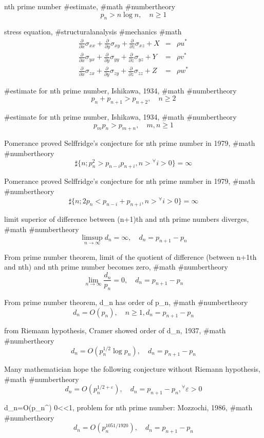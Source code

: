 nth prime number #estimate, #math #numbertheory
$$
p_n>n\log n, \quad n \ge 1
$$

stress equation, #structuralanalysis #mechanics #math
$$
\begin{array}{lll}
\frac{\partial}{\partial x}\sigma_{xx}+\frac{\partial}{\partial y}\sigma_{xy}+\frac{\partial}{\partial z}\sigma_{xz}+X &=& \rho u^* \\
\frac{\partial}{\partial x}\sigma_{yx}+\frac{\partial}{\partial y}\sigma_{yy}+\frac{\partial}{\partial z}\sigma_{yz}+Y &=& \rho v^* \\
\frac{\partial}{\partial x}\sigma_{zx}+\frac{\partial}{\partial y}\sigma_{zy}+\frac{\partial}{\partial z}\sigma_{zz}+Z &=& \rho w^* 
\end{array}
$$

#estimate for nth prime number, Ishikawa, 1934, #math #numbertheory
$$
p_n+p_{n+1} > p_{n+2}, \quad n \ge 2
$$

#estimate for nth prime number, Ishikawa, 1934, #math #numbertheory
$$
p_m p_n > p_{m+n}, \quad m,n \ge 1
$$

Pomerance proved Selffridge’s conjecture for nth prime number in 1979, #math #numbertheory
$$
\sharp\{n; p_n^2>p_{n-i}p_{n+i}, n>{}^\forall i>0\}=\infty
$$

Pomerance proved Selffridge’s conjecture for nth prime number in 1979, #math #numbertheory
$$
\sharp\{n; 2 p_n<p_{n-i}+p_{n+i}, n>{}^\forall i>0\}=\infty
$$

limit superior of difference between (n+1)th and nth prime numbers diverges, #math #numbertheory
$$
\limsup_{n \rightarrow \infty} d_n=\infty, \quad d_n=p_{n+1}-p_n
$$

From prime number theorem, limit of the quotient of difference (between n+1th and nth) and nth prime number becomes zero, #math #numbertheory
$$
\lim_{n \rightarrow \infty} \frac{d_n}{p_n}=0, \quad d_n=p_{n+1}-p_n
$$

From prime number theorem, d_n has order of p_n, #math #numbertheory
$$
d_n=O(p_n), \quad n \ge 1,d_n=p_{n+1}-p_n
$$

from Riemann hypothesis, Cramer showed order of d_n, 1937,  #math #numbertheory
$$
d_n=O(p_n^{1/2}\log p_n), \quad d_n=p_{n+1}-p_n
$$

Many mathematician hope the following conjecture without Riemann hypothesis, #math #numbertheory
$$
d_n=O(p_n^{1/2+\varepsilon}), \quad d_n=p_{n+1}-p_n, {}^{\forall}\varepsilon>0
$$

d_n=O(p_n^\theta) 0<\theta <1,  problem for nth prime number: Mozzochi, 1986, #math #numbertheory
$$
d_n=O(p_n^{1051/1920}), \quad d_n=p_{n+1}-p_n
$$

